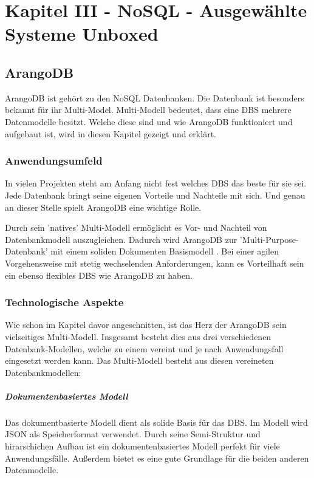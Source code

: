 \chapter{Kapitel III - NoSQL - Ausgewählte Systeme Unboxed}
\setcounter{section}{7}
\section{ArangoDB}
ArangoDB ist gehört zu den \ac{NoSQL} Datenbanken. Die Datenbank ist besonders bekannt für ihr Multi-Model. Multi-Modell bedeutet, dass eine \ac{DBS} mehrere Datenmodelle besitzt. Welche diese sind und wie ArangoDB funktioniert und aufgebaut ist, wird in diesen Kapitel gezeigt und erklärt.
\subsection{Anwendungsumfeld}
In vielen Projekten steht am Anfang nicht fest welches \ac{DBS} das beste für sie sei. Jede Datenbank bringt seine eigenen Vorteile und Nachteile mit sich. Und genau an dieser Stelle spielt ArangoDB eine wichtige Rolle. 

Durch sein 'natives' Multi-Modell ermöglicht es Vor- und Nachteil von Datenbankmodell auszugleichen. Dadurch wird ArangoDB zur 'Multi-Purpose-Datenbank' mit einem soliden Dokumenten Basismodell \citep{jaxenter01}. Bei einer agilen Vorgehensweise mit stetig wechselenden Anforderungen, kann es Vorteilhaft sein ein ebenso flexibles \ac{DBS} wie ArangoDB zu haben. 

 \subsection{Technologische Aspekte}
Wie schon im Kapitel davor angeschnitten, ist das Herz der ArangoDB sein vielseitiges Multi-Modell. Insgesamt besteht dies aus drei verschiedenen Datenbank-Modellen, welche zu einem vereint und je nach Anwendungsfall 
eingesetzt werden kann.
Das Multi-Modell besteht aus diesen vereineten Datenbankmodellen:
\paragraph{Dokumentenbasiertes Modell} Das dokumentbasierte Modell dient als solide Basis für das \ac{DBS}. Im Modell wird \ac{JSON} als Speicherformat verwendet. Durch seine Semi-Struktur und hirarschichen Aufbau ist  ein dokumentenbasiertes Modell perfekt für viele Anwendungsfälle\cite{AWS_doc}.  Außerdem bietet es eine gute Grundlage für die beiden anderen Datenmodelle.
